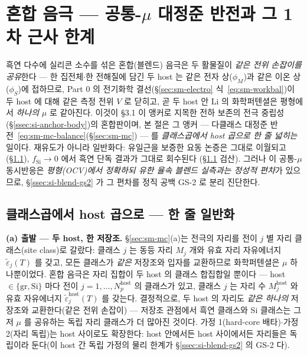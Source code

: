 \section{혼합 음극 --- 공통-$\mu$ 대정준 반전과 그 1차 근사 한계}\label{sec:si-blend}
흑연 다수에 실리콘 소수를 섞은 혼합(블렌드) 음극은 두 활물질이 \emph{같은 전위 손잡이를 공유}한다 ---
한 집전체$\cdot$한 전해질에 담긴 두 host 는 같은 전자 상($\phi_M$)과 같은 이온 상($\phi_S$)에 접하므로,
Part 0 의 전기화학 결선(\S\ref{sec:sm-electro} 식~\eqref{eq:sm-workbal})이 두 host 에 대해 같은 측정
전위 $V$ 로 닫히고, 곧 두 host 안 Li 의 화학퍼텐셜은 평형에서 \emph{하나의} $\mu$ 로 같아진다. 이것이
§3.1 이 앵커로 지목한 전하 보존의 전극 중립성(\S\ref{ssec:si-anchor-body})의 혼합판이며, 본 절은 그
앵커 --- 다클래스 대정준 반전~\eqref{eq:sm-mc-balance}(\S\ref{sec:sm-mc}) --- 를 \emph{클래스곱에서
host 곱으로 한 줄 넓히는} 일이다. 재유도가 아니라 일반화다: 유일근을 보증한 요동 논증은 그대로 이월되고
(\S\ref{ssec:si-blend-derive}), $f_\mathrm{Si}\to0$ 에서 흑연 단독 결과가 그대로 회수된다
(\S\ref{ssec:si-blend-derive} 검산). 그러나 이 공통-$\mu$ 동시반응은 \emph{평형(OCV)에서 정확하되 유한
율속 블렌드 실측과는 정성적 편차}가 있으므로, \S\ref{ssec:si-blend-gs2} 가 그 편차를 정직 공백 GS-2 로
분리 진단한다.

\subsection{클래스곱에서 host 곱으로 --- 한 줄 일반화}\label{ssec:si-blend-derive}
\textbf{(a) 출발 --- 두 host, 한 저장조.} \S\ref{sec:sm-mc}(a)는 전극의 자리를 전이 $j$ 별 자리
클래스(site class)로 갈랐다: 클래스 $j$ 는 동등 자리 $M_j$ 개와 유효 자리 자유에너지
$\tilde\varepsilon_j(T)$ 를 갖고, 모든 클래스가 \emph{같은} 저장조와 입자를 교환하므로 화학퍼텐셜은
$\mu$ 하나뿐이었다. 혼합 음극은 자리 집합이 두 host 의 클래스 합집합일 뿐이다 --- host $\in\{\mathrm{gr},
\mathrm{Si}\}$ 마다 전이 $j=1,\dots,N_p^\mathrm{host}$ 의 클래스가 있고, 클래스 $j$ 는 자리 수
$M_j^\mathrm{host}$ 와 유효 자유에너지 $\tilde\varepsilon_j^\mathrm{host}(T)$ 를 갖는다. 결정적으로, 두
host 의 자리도 \emph{같은 하나의} 저장조와 교환한다(같은 전위 손잡이) --- 저장조 관점에서 흑연 클래스와
Si 클래스는 그저 $\mu$ 를 공유하는 독립 자리 클래스가 더 많아진 것이다. 가정 1(hard-core 배타)$\cdot$가정
2(자리 독립)는 host 사이로도 확장한다: host 안에서든 host 사이에서든 자리들은 독립이라 둔다(이 host 간
독립 가정의 물리 한계가 \S\ref{ssec:si-blend-gs2} 의 GS-2 다).

